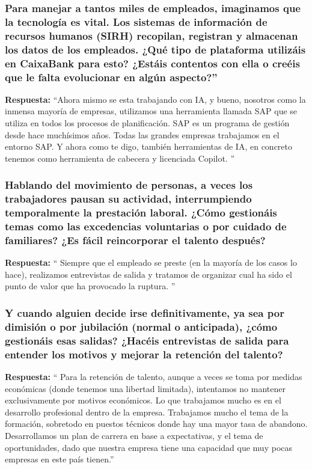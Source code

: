 
\subsubsection*{Para manejar a tantos miles de empleados, imaginamos que la tecnología es vital. Los sistemas de información de recursos humanos (SIRH) recopilan, registran y almacenan los datos de los empleados. ¿Qué tipo de plataforma utilizáis en CaixaBank para esto? ¿Estáis contentos con ella o creéis que le falta evolucionar en algún aspecto?”}

\textbf{Respuesta:}\newline
``Ahora mismo se esta trabajando con IA, y bueno, nosotros como la inmensa mayoría de empresas, utilizamos una herramienta llamada SAP que se utiliza en todos los procesos de planificación. SAP es un programa de gestión desde hace muchísimos años. Todas las grandes empresas trabajamos en el entorno SAP. Y ahora como te digo, también herramientas de IA, en concreto tenemos como herramienta de cabecera y licenciada Copilot. ''

\subsubsection*{Hablando del movimiento de personas, a veces los trabajadores pausan su actividad, interrumpiendo temporalmente la prestación laboral. ¿Cómo gestionáis temas como las excedencias voluntarias o por cuidado de familiares? ¿Es fácil reincorporar el talento después?}
\textbf{Respuesta:}\newline
`` Siempre que el empleado se preste (en la mayoría de los casos lo hace), realizamos entrevistas de salida y tratamos de organizar cual ha sido el punto de valor que ha provocado la ruptura. ''

\subsubsection*{Y cuando alguien decide irse definitivamente, ya sea por dimisión o por jubilación (normal o anticipada), ¿cómo gestionáis esas salidas? ¿Hacéis entrevistas de salida para entender los motivos y mejorar la retención del talento?}
\textbf{Respuesta:}\newline
`` Para la retención de talento, aunque a veces se toma por medidas económicas (donde tenemos una libertad limitada), intentamos no mantener exclusivamente por motivos económicos. Lo que trabajamos mucho es en el desarrollo profesional dentro de la empresa. Trabajamos mucho el tema de la formación, sobretodo en puestos técnicos donde hay una mayor tasa de abandono. Desarrollamos un plan de carrera en base a expectativas, y el tema de oportunidades, dado que nuestra empresa tiene una capacidad que muy pocas empresas en este país tienen.''

